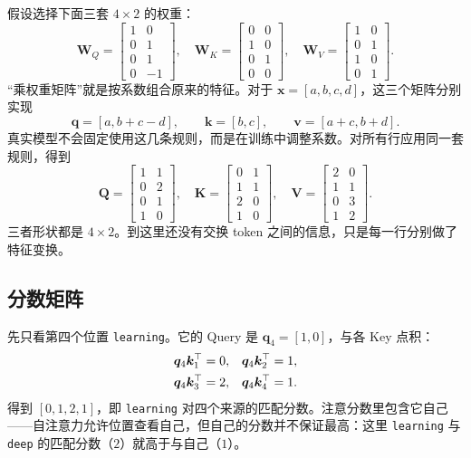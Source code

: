 \documentclass[UTF8,a4paper,12pt]{ctexart}
\numberwithin{equation}{section}
\begin{document}
假设选择下面三套 $4\times2$ 的权重：
\begin{equation}
\bm W_Q=\begin{bmatrix}1&0\\0&1\\0&1\\0&-1\end{bmatrix},\quad
\bm W_K=\begin{bmatrix}0&0\\1&0\\0&1\\0&0\end{bmatrix},\quad
\bm W_V=\begin{bmatrix}1&0\\0&1\\1&0\\0&1\end{bmatrix}.
\label{eq:toyweights}
\end{equation}
``乘权重矩阵''就是按系数组合原来的特征。对于 $\bm x=[a,b,c,d]$，这三个矩阵分别实现
\begin{equation}
\bm q=[a,b+c-d],\qquad
\bm k=[b,c],\qquad
\bm v=[a+c,b+d].
\label{eq:projectionmeaning}
\end{equation}
真实模型不会固定使用这几条规则，而是在训练中调整系数。对所有行应用同一套规则，得到
\begin{equation}
\bm Q=\begin{bmatrix}1&1\\0&2\\0&1\\1&0\end{bmatrix},\quad
\bm K=\begin{bmatrix}0&1\\1&1\\2&0\\1&0\end{bmatrix},\quad
\bm V=\begin{bmatrix}2&0\\1&1\\0&3\\1&2\end{bmatrix}.
\label{eq:toyqkv}
\end{equation}
三者形状都是 $4\times2$。到这里还没有交换 token 之间的信息，只是每一行分别做了特征变换。

\subsection{分数矩阵}

先只看第四个位置 \texttt{learning}。它的 Query 是 $\bm q_4=[1,0]$，与各 Key 点积：
\begin{align}
\bm q_4\bm k_1^\top&=0,&
\bm q_4\bm k_2^\top&=1,\notag\\
\bm q_4\bm k_3^\top&=2,&
\bm q_4\bm k_4^\top&=1.
\label{eq:fourthscores}
\end{align}
得到 $[0,1,2,1]$，即 \texttt{learning} 对四个来源的匹配分数。注意分数里包含它自己——自注意力允许位置查看自己，但自己的分数并不保证最高：这里 \texttt{learning} 与 \texttt{deep} 的匹配分数（$2$）就高于与自己（$1$）。
\end{document}
